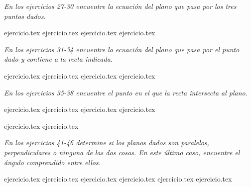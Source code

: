 \vspace{0.3cm}
\noindent\textit{En los ejercicios 27-30 encuentre la ecuación del plano que pasa por los tres puntos dados.}

\begin{enumerate}
    \setcounter{enumi}{26}
    {ejercicio.tex}
{ejercicio.tex}
{ejercicio.tex}
{ejercicio.tex}
\end{enumerate}

\vspace{0.3cm}
\noindent\textit{En los ejercicios 31-34 encuentre la ecuación del plano que pasa por el punto dado y contiene a la recta indicada.}

\begin{enumerate}
    \setcounter{enumi}{30}
    {ejercicio.tex}
{ejercicio.tex}
{ejercicio.tex}
{ejercicio.tex}
\end{enumerate}

\vspace{0.3cm}
\noindent\textit{En los ejercicios 35-38 encuentre el punto en el que la recta intersecta al plano.}

\begin{enumerate}
    \setcounter{enumi}{34}
    {ejercicio.tex}
{ejercicio.tex}
{ejercicio.tex}
{ejercicio.tex}
\end{enumerate}

\vspace{0.3cm}
\begin{enumerate}
    \setcounter{enumi}{38}
    {ejercicio.tex}
{ejercicio.tex}
\end{enumerate}

\vspace{0.3cm}
\noindent\textit{En los ejercicios 41-46 determine si los planos dados son paralelos, perpendiculares o ninguna de las dos cosas. En este último caso, encuentre el ángulo comprendido entre ellos.}

\begin{enumerate}
    \setcounter{enumi}{40}
    {ejercicio.tex}
{ejercicio.tex}
{ejercicio.tex}
{ejercicio.tex}
{ejercicio.tex}
{ejercicio.tex}
\end{enumerate}

